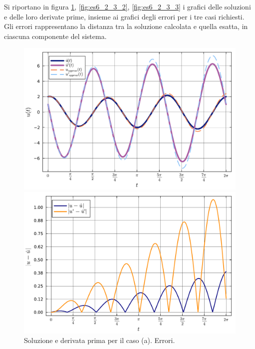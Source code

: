 \documentclass[letterpaper, 12pt]{article}
\numberwithin{equation}{section}    %
\begin{document}
Si riportano in figura \ref{fig:es6_2_3_1}, \ref{fig:es6_2_3_2}, \ref{fig:es6_2_3_3} i grafici delle soluzioni
e delle loro derivate prime, insieme ai grafici degli errori per i tre casi richiesti. Gli errori rappresentano 
la distanza tra la soluzione calcolata e quella esatta, in ciascuna componente del sistema.
\begin{figure}[!ht]
    \centering
    \begin{minipage}[b]{0.47\textwidth}
        \includegraphics[width=\textwidth]{6231.pdf}
    \end{minipage}
    \hspace{0.5cm}
    \begin{minipage}[b]{0.47\textwidth}
        \includegraphics[width=\textwidth]{6232.pdf}
    \end{minipage}
    \caption{Soluzione e derivata prima per il caso (a). Errori.}
    \label{fig:es6_2_3_1}
\end{figure}
\end{document}
